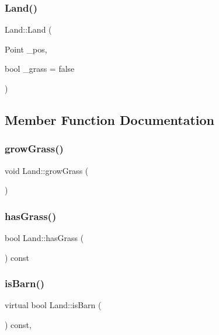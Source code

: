 \subsubsection{\texorpdfstring{Land()}{Land()}}
{\footnotesize\ttfamily Land\+::\+Land (\begin{DoxyParamCaption}\item[{Point}]{\+\_\+pos,  }\item[{bool}]{\+\_\+grass = {\ttfamily false} }\end{DoxyParamCaption})}



\subsection{Member Function Documentation}
\mbox{\label{classLand_a8324641dc1cfdf2500a345441998c18d}} 
\subsubsection{\texorpdfstring{growGrass()}{growGrass()}}
{\footnotesize\ttfamily void Land\+::grow\+Grass (\begin{DoxyParamCaption}{ }\end{DoxyParamCaption})}

\mbox{\label{classLand_aecde97d7ed842f3bf3fdff52a6057cc5}} 
\subsubsection{\texorpdfstring{hasGrass()}{hasGrass()}}
{\footnotesize\ttfamily bool Land\+::has\+Grass (\begin{DoxyParamCaption}{ }\end{DoxyParamCaption}) const}

\mbox{\label{classLand_a0e7a4fa66fb495bada48ac00974bf5a7}} 
\subsubsection{\texorpdfstring{isBarn()}{isBarn()}}
{\footnotesize\ttfamily virtual bool Land\+::is\+Barn (\begin{DoxyParamCaption}{ }\end{DoxyParamCaption}) const\hspace{0.3cm}{\ttfamily [inline]}, {\ttfamily [virtual]}}




